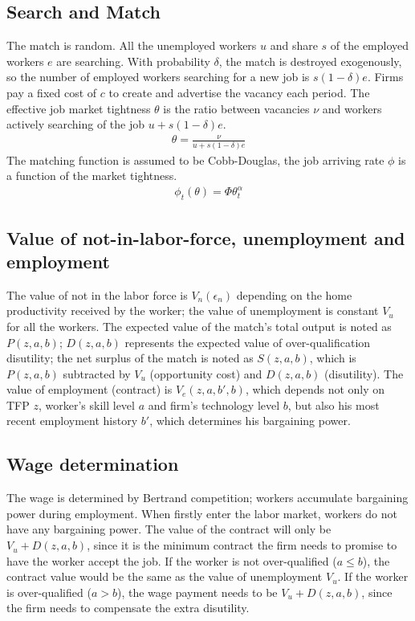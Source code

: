 \documentclass[12pt]{article}
\newcommand{\1}{\mathbb{1}}
\begin{document}
\subsection{Search and Match}
The match is random. All the unemployed workers $u$ and share $s$ of the employed workers $e$ are searching. With probability $\delta$, the match is destroyed exogenously, so the number of employed workers searching for a new job is $s(1-\delta)e$. Firms pay a fixed cost of $c$ to create and advertise the vacancy each period. 
The effective job market tightness $\theta$ is the ratio between vacancies $\nu$ and workers actively searching of the job $u+s(1-\delta)e$. 
\begin{align*}
\theta = \frac{\nu}{u+s(1-\delta)e}
\end{align*}
The matching function is assumed to be Cobb-Douglas, the job arriving rate $\phi$ is a function of the market tightness.  
\begin{align*}
\phi_t(\theta) = \Phi \theta_t^\alpha
\end{align*}

\subsection{Value of not-in-labor-force, unemployment and employment }
The value of not in the labor force is $V_n(\epsilon_n)$ depending on the home productivity received by the worker; the value of unemployment is constant $V_u$ for all the workers. The expected value of the match's total output is noted as $P(z,a,b)$; $D(z,a,b)$ represents the expected value of over-qualification disutility; the net surplus of the match is noted as $S(z,a,b)$, which is $P(z,a,b)$ subtracted by $V_u$ (opportunity cost) and $D(z,a,b)$ (disutility). The value of employment (contract) is $V_e(z,a,b',b)$, which depends not only on TFP $z$, worker's skill level $a$ and firm's technology level $b$, but also his most recent employment history $b'$, which determines his bargaining power. 

\subsection{Wage determination}
The wage is determined by Bertrand competition; workers accumulate bargaining power during employment. When firstly enter the labor market, workers do not have any bargaining power. The value of the contract will only be $V_u+D(z,a,b)$, since it is the minimum contract the firm needs to promise to have the worker accept the job. If the worker is not over-qualified ($a \leq b$), the contract value would be the same as the value of unemployment $V_u$. If the worker is over-qualified ($a>b$), the wage payment needs to be $V_u+D(z,a,b)$, since the firm needs to compensate the extra disutility.  
\end{document}
